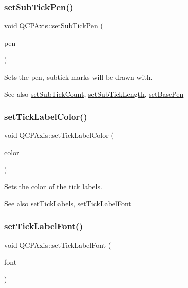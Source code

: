 \subsubsection{\texorpdfstring{set\+Sub\+Tick\+Pen()}{setSubTickPen()}}
{\footnotesize\ttfamily void Q\+C\+P\+Axis\+::set\+Sub\+Tick\+Pen (\begin{DoxyParamCaption}\item[{const Q\+Pen \&}]{pen }\end{DoxyParamCaption})}

Sets the pen, subtick marks will be drawn with.

\begin{DoxySeeAlso}{See also}
\mbox{\hyperlink{class_q_c_p_axis_a4b1554ead9d7f9799650d51383e326dd}{set\+Sub\+Tick\+Count}}, \mbox{\hyperlink{class_q_c_p_axis_ab702d6fd42fc620607435339a1c2a2e1}{set\+Sub\+Tick\+Length}}, \mbox{\hyperlink{class_q_c_p_axis_a778d45fb71b3c7ab3bb7079e18b058e4}{set\+Base\+Pen}} 
\end{DoxySeeAlso}
\mbox{\label{class_q_c_p_axis_a395e445c3fe496b935bee7b911ecfd1c}} 
\subsubsection{\texorpdfstring{set\+Tick\+Label\+Color()}{setTickLabelColor()}}
{\footnotesize\ttfamily void Q\+C\+P\+Axis\+::set\+Tick\+Label\+Color (\begin{DoxyParamCaption}\item[{const Q\+Color \&}]{color }\end{DoxyParamCaption})}

Sets the color of the tick labels.

\begin{DoxySeeAlso}{See also}
\mbox{\hyperlink{class_q_c_p_axis_a04ba16e1f6f78d70f938519576ed32c8}{set\+Tick\+Labels}}, \mbox{\hyperlink{class_q_c_p_axis_a2b8690c4e8dbc39d9185d2b398ce7a6c}{set\+Tick\+Label\+Font}} 
\end{DoxySeeAlso}
\mbox{\label{class_q_c_p_axis_a2b8690c4e8dbc39d9185d2b398ce7a6c}} 
\subsubsection{\texorpdfstring{set\+Tick\+Label\+Font()}{setTickLabelFont()}}
{\footnotesize\ttfamily void Q\+C\+P\+Axis\+::set\+Tick\+Label\+Font (\begin{DoxyParamCaption}\item[{const Q\+Font \&}]{font }\end{DoxyParamCaption})}

